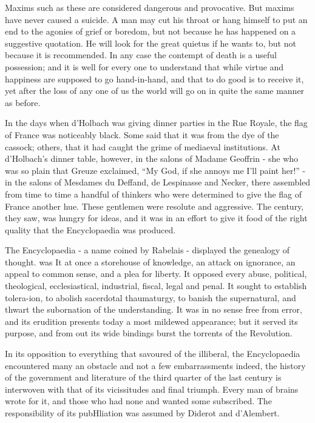 \documentclass[]{book}
\begin{document}
Maxims such as these are considered dangerous and provocative. But
maxims have never caused a suicide. A man may cut his throat or hang
himself to put an end to the agonies of grief or boredom, but not
because he has happened on a suggestive quotation. He will look for the
great quietus if he wants to, but not because it is recommended. In any
case the contempt of death is a useful possession; and it is well for
every one to understand that while virtue and happiness are supposed to
go hand-in-hand, and that to do good is to receive it, yet after the
loss of any one of us the world will go on in quite the same manner as
before.

In the days when d'Holbach was giving dinner parties in the Rue Royale,
the flag of France was noticeably black. Some said that it was from the
dye of the cassock; others, that it had caught the grime of mediaeval
institutions. At d'Holbach's dinner table, however, in the salons of
Madame Geoffrin - she who was so plain that Greuze exclaimed, ``My God,
if she annoys me I'll paint her!'' - in the salons of Mesdames du
Deffand, de Lespinasse and Necker, there assembled from time to time a
handful of thinkers who were determined to give the flag of France
another hue. These gentlemen were resolute and aggressive. The century,
they saw, was hungry for ideas, and it was in an effort to give it food
of the right quality that the Encyclopaedia was produced.

The Encyclopaedia - a name coined by Rabelais - displayed the genealogy
of thought. was It at once a storehouse of knowledge, an attack on
ignorance, an appeal to common sense, and a plea for liberty. It opposed
every abuse, political, theological, ecclesiastical, industrial, fiscal,
legal and penal. It sought to establish tolera-ion, to abolish
sacerdotal thaumaturgy, to banish the supernatural, and thwart the
subornation of the understanding. It was in no sense free from error,
and its erudition presents today a most mildewed appearance; but it
served its purpose, and from out its wide bindings burst the torrents of
the Revolution.

In its opposition to everything that savoured of the illiberal, the
Encyclopaedia encountered many an obstacle and not a few embarrassments
indeed, the history of the government and literature of the third
quarter of the last century is interwoven with that of its vicissitudes
and final triumph. Every man of brains wrote for it, and those who had
none and wanted some subscribed. The responsibility of its pubHliation
was assumed by Diderot and d'Alembert.
\end{document}
